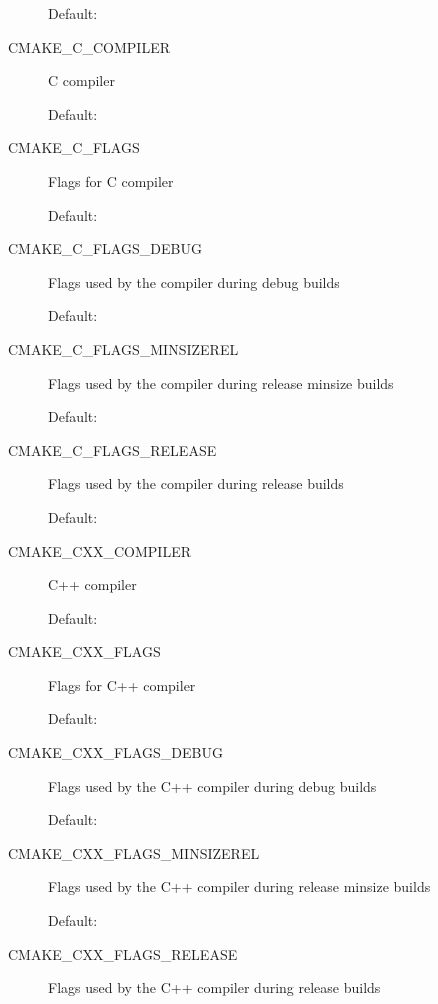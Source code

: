 \documentclass[letterpaper,10pt,english]{sphinxmanual}
\begin{document}
\begin{description}
Default:

\item[{\index{CMAKE\_C\_COMPILER (CMake option)}CMAKE\_C\_COMPILER}] \leavevmode
C compiler

Default: 

\item[{\index{CMAKE\_C\_FLAGS (CMake option)}CMAKE\_C\_FLAGS}] \leavevmode
Flags for C compiler

Default:

\item[{\index{CMAKE\_C\_FLAGS\_DEBUG (CMake option)}CMAKE\_C\_FLAGS\_DEBUG}] \leavevmode
Flags used by the compiler during debug
builds

Default: 

\item[{\index{CMAKE\_C\_FLAGS\_MINSIZEREL (CMake option)}CMAKE\_C\_FLAGS\_MINSIZEREL}] \leavevmode
Flags used by the compiler during release minsize builds

Default: 

\item[{\index{CMAKE\_C\_FLAGS\_RELEASE (CMake option)}CMAKE\_C\_FLAGS\_RELEASE}] \leavevmode
Flags used by the compiler during release
builds

Default: 

\item[{\index{CMAKE\_CXX\_COMPILER (CMake option)}CMAKE\_CXX\_COMPILER}] \leavevmode
C++ compiler

Default: 

\item[{\index{CMAKE\_CXX\_FLAGS (CMake option)}CMAKE\_CXX\_FLAGS}] \leavevmode
Flags for C++ compiler

Default:

\item[{\index{CMAKE\_CXX\_FLAGS\_DEBUG (CMake option)}CMAKE\_CXX\_FLAGS\_DEBUG}] \leavevmode
Flags used by the C++ compiler during debug builds

Default: 

\item[{\index{CMAKE\_CXX\_FLAGS\_MINSIZEREL (CMake option)}CMAKE\_CXX\_FLAGS\_MINSIZEREL}] \leavevmode
Flags used by the C++ compiler during release minsize builds

Default: 

\item[{\index{CMAKE\_CXX\_FLAGS\_RELEASE (CMake option)}CMAKE\_CXX\_FLAGS\_RELEASE}] \leavevmode
Flags used by the C++ compiler during release builds


\end{description}
\end{document}
